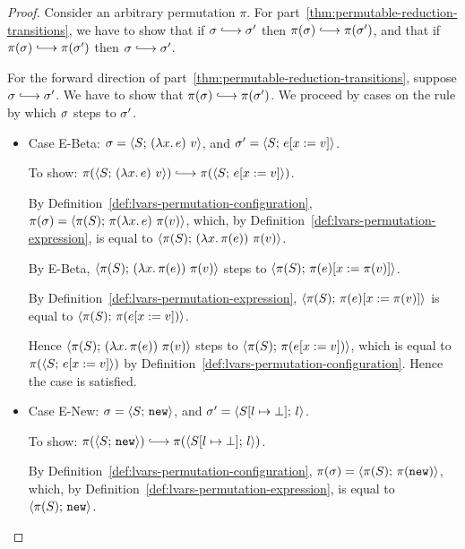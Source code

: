 \begin{proof}
  Consider an arbitrary permutation $\pi$.  For
  part~\ref{thm:permutable-reduction-transitions}, we have to show
  that if $\conf \parstepsto \conf'$ then $\pi(\conf) \parstepsto
  \pi(\conf')$, and that if $\pi(\conf) \parstepsto \pi(\conf')$ then
  $\conf \parstepsto \conf'$.

  For the forward direction of
  part~\ref{thm:permutable-reduction-transitions}, suppose $\conf
  \parstepsto \conf'$.  We have to show that $\pi(\conf) \parstepsto
  \pi(\conf')$.  We proceed by cases on the rule by which $\sigma$
  steps to $\sigma'$.

  \begin{itemize}
    \item Case {\sc E-Beta}: $\sigma =
      \langle S;\, (\lambda x.\,e)~v \rangle$, and $\sigma' =
      \langle S;\, e[x := v] \rangle$.

      To show: $\pi(\config{S}{\app{(\lam{x}{e})}{v}}) \parstepsto
      \pi(\config{S}{\subst{e}{x}{v}})$.

      By Definition~\ref{def:lvars-permutation-configuration},
      $\pi(\sigma) = \langle \pi(S);\, \pi(\lambda x.\,e)~\pi(v) \rangle$,
      which, by Definition~\ref{def:lvars-permutation-expression}, is
      equal to $\langle \pi(S);\, (\lambda x.\,\pi(e))~\pi(v) \rangle$.

      By {\sc E-Beta},
      $\langle \pi(S);\, (\lambda x.\,\pi(e))~\pi(v) \rangle$ steps to
      $\langle \pi(S);\, \pi(e)[x := \pi(v)] \rangle$.

      By Definition~\ref{def:lvars-permutation-expression},
      $\langle \pi(S);\, \pi(e)[x := \pi(v)] \rangle$ is equal to
      $\langle \pi(S);\, \pi(e[x := v]) \rangle$.

      Hence $\langle \pi(S);\, (\lambda x.\,\pi(e))~\pi(v) \rangle$ steps
      to $\langle \pi(S);\, \pi(e[x := v]) \rangle$, which is equal to
      $\pi(\langle S;\, e[x := v] \rangle)$ by
      Definition~\ref{def:lvars-permutation-configuration}.  Hence the
      case is satisfied.

    \item Case {\sc E-New}: $\sigma = \langle S;\, \mbox{\texttt{new}} \rangle$, and $\sigma' =
      \langle S[l \mapsto \bot];\, l \rangle$.

      To show: $\pi(\config{S}{\NEW}) \parstepsto
      \pi(\config{\extSRaw{S}{l}{\bot}}{l})$.

      By Definition~\ref{def:lvars-permutation-configuration},
      $\pi(\sigma) = \langle \pi(S);\, \pi(\mbox{\texttt{new}}) \rangle$, which, by
      Definition~\ref{def:lvars-permutation-expression}, is equal to
      $\langle \pi(S);\, \mbox{\texttt{new}} \rangle$.


\end{itemize}
\end{proof}
